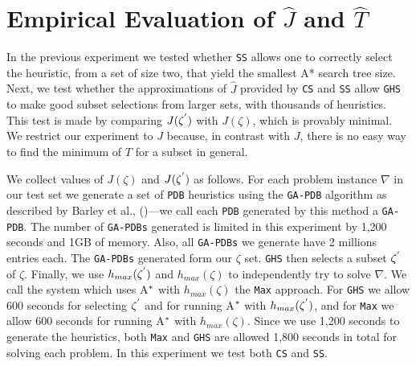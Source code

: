 %
%
%

\section{Empirical Evaluation of $\hat{J}$ and $\hat{T}$}



\noindent
In the previous experiment we tested whether \texttt{SS} allows one to correctly select the heuristic, from a set of size two, that yield the smallest A* search tree size. Next, we test whether the approximations of $\hat{J}$ provided by \texttt{CS} and \texttt{SS} allow \texttt{GHS} to make good subset selections from larger sets, with thousands of heuristics. This test is made by comparing $J(\zeta\sp{'})$ with $J(\zeta)$, which is provably minimal. We restrict our experiment to $J$ because, in contrast with $J$, there is no easy way to find the minimum of $T$ for a subset in general. 

We collect values of $J(\zeta)$ and $J(\zeta\sp{'})$ as follows. For each problem instance $\nabla$ in our test set we generate a set of \texttt{PDB} heuristics using the \texttt{GA-PDB} algorithm as described by Barley et al., (\citeyear{BarleySantiagoOver})---we call each \texttt{PDB} generated by this method a \texttt{GA-PDB}. The number of \texttt{GA-PDBs} generated is limited in this experiment by 1,200 seconds and 1GB of memory. Also, all \texttt{GA-PDBs} we generate have 2 millions entries each. The \texttt{GA-PDBs} generated form our $\zeta$ set. \texttt{GHS} then selects a subset $\zeta\sp{'}$ of $\zeta$. Finally, we use $h_{max}(\zeta\sp{'})$ and $h_{max}(\zeta)$ to independently try to solve $\nabla$. We call the system which uses A$\sp{*}$ with $h_{max}(\zeta)$ the \texttt{Max} approach. For \texttt{GHS} we allow 600 seconds for selecting $\zeta\sp{'}$ and for running A$\sp{*}$ with $h_{max}(\zeta\sp{'})$, and for \texttt{Max} we allow 600 seconds for running A$\sp{*}$ with $h_{max}(\zeta)$. Since we use 1,200 seconds to generate the heuristics, both \texttt{Max} and \texttt{GHS} are allowed 1,800 seconds in total for solving each problem. In this experiment we test both \texttt{CS} and \texttt{SS}.

